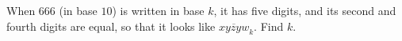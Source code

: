 When $666$ (in base $10$) is written in base $k$, it has five digits, and its second and fourth digits are equal, so that it looks like $\overline{xyzyw}_k$. Find $k$.
